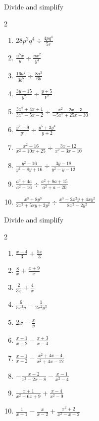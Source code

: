 \documentclass[12pt]{article}
\newenvironment{problem}[2][Problem]{\begin{trivlist}
\item[\hskip \labelsep {\bfseries #1}\hskip \labelsep {\bfseries #2.}]}{\end{trivlist}}
\begin{document}
\begin{problem}{3} Divide and simplify
 \begin{multicols}{2}
   \begin{enumerate}[label=\roman*)]
     \item $28p^2q^4\div\frac{4pq^4}{5r}$
     \item $\frac{u^5x}{y}\div\frac{ux^2}{y^4}$
     \item $\frac{16a^7}{3b^5}\div\frac{8a^3}{6b}$
     \item $\frac{3y+15}{y^7}\div\frac{y+5}{Y^2}$
     \item $\frac{3x^2+4x+1}{3x^2-5x-2}\div\frac{x^2-2x-3}{-5x^2+25x-30}$
     \item $\frac{y^2-9}{y^2}\div\frac{y^5+3y^4}{y+2}$
     \item $\frac{x^2-16}{x^2-10x+25}\div\frac{3x-12}{x^2-3x-10}$
     \item $\frac{y^2-16}{y^2-8y+16}\div\frac{3y-18}{y^2-y-12}$
     \item $\frac{a^3+4a}{a^2-16}\div\frac{a^2+8a+15}{a^2+a-20}$
         \item $\frac{x^3+8y^3}{2x^2+5xy+2y^2}\div\frac{x^3-2x^2y+4xy^2}{8x^2-2y^2}$
  \end{enumerate}
 \end{multicols}
\end{problem}

\newpage
\begin{problem}{4} Divide and simplify
 \begin{multicols}{2}
   \begin{enumerate}[label=\roman*)]
   \item $\frac{x-4}{3} + \frac{5x}{3}$
   \item $\frac{8}{x} + \frac{x+9}{x}$
   \item $\frac{2}{3x} + \frac{4}{x}$
   \item $\frac{6}{5x^3y} - \frac{1}{2x^2y^3}$
   \item $2x - \frac{x}{y}$
   \item $\frac{x-1}{x+2} - \frac{x+3}{x-4}$
   \item $\frac{x-1}{x-2} -  \frac{x^2+4x-4}{x^2+4x-12}$
   \item $-\frac{x-2}{x^2-2x-8} - \frac{x-1}{x^2-4}$
   \item $\frac{x+1}{x^2+6x+9} +\frac{x-4}{x^2-9}$
   \item $\frac{1}{x+1} - \frac{x}{x-2} + \frac{x^2+2}{x^2-x-2}$     
  \end{enumerate}
 \end{multicols}
\end{problem}
\end{document}
